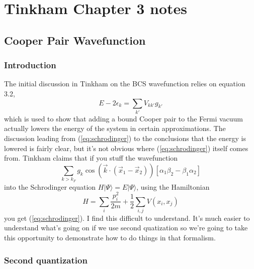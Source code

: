 \documentclass{article}
\begin{document}
\section*{Tinkham Chapter 3 notes}


\subsection*{Cooper Pair Wavefunction}


\subsubsection*{Introduction}

The initial discussion in Tinkham on the BCS wavefunction relies on
equation 3.2,\begin{equation}
E-2\epsilon_{k}=\sum_{k'}V_{kk'}g_{k'}\label{eq:schrodinger}\end{equation}
which is used to show that adding a bound Cooper pair to the Fermi
vacuum actually lowers the energy of the system in certain approximations.
The discussion leading from (\ref{eq:schrodinger}) to the conclusions
that the energy is lowered is fairly clear, but it's not obvious where
(\ref{eq:schrodinger}) itself comes from. Tinkham claims that if
you stuff the wavefunction\begin{equation}
\sum_{k>k_{F}}g_{k}\cos\left(\vec{k}\cdot(\vec{x}_{1}-\vec{x}_{2})\right)\left[\alpha_{1}\beta_{2}-\beta_{1}\alpha_{2}\right]\label{eq:wavefunction_1st}\end{equation}
into the Schrodinger equation $H|\Psi\rangle=E|\Psi\rangle$, using
the Hamiltonian\begin{equation}
H=\sum_{i}\frac{p_{i}^{2}}{2m}+\frac{1}{2}\sum_{i,j}V(x_{i},x_{j})\label{eq:hamiltonian_1st}\end{equation}
you get (\ref{eq:schrodinger}). I find this difficult to understand.
It's much easier to understand what's going on if we use second quatization
so we're going to take this opportunity to demonstrate how to do things
in that formalism.


\subsubsection*{Second quantization}
\end{document}
